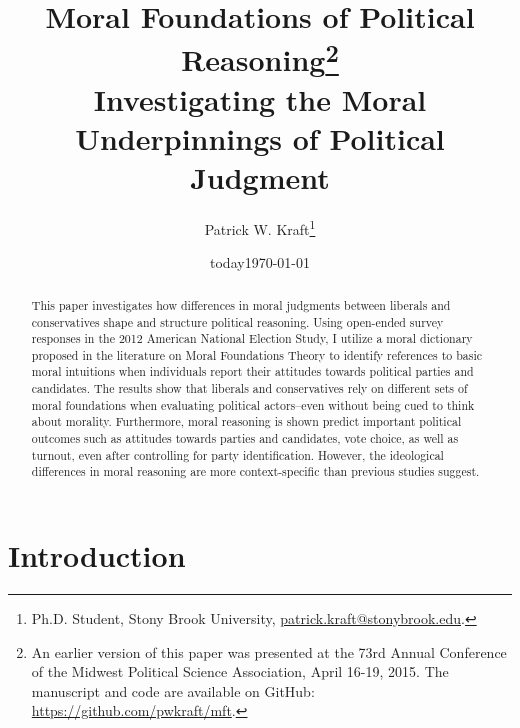\documentclass[12pt]{article}
\author{Patrick W. Kraft\footnote{Ph.D. Student, Stony Brook University, \href{mailto:patrick.kraft@stonybrook.edu}{patrick.kraft@stonybrook.edu}.
}}
\date{today}
\title{Moral Foundations of Political Reasoning\footnote{An earlier version of this paper was presented at the 73rd Annual Conference of the Midwest Political Science Association, April 16-19, 2015. The manuscript and code are available on GitHub: \url{https://github.com/pwkraft/mft}.}\\
\large{Investigating the Moral Underpinnings of Political Judgment}}
\date{\today}
\begin{document}
\maketitle
\onehalfspacing

\begin{abstract}
This paper investigates how differences in moral judgments between liberals and conservatives shape and structure political reasoning. Using open-ended survey responses in the 2012 American National Election Study, I utilize a moral dictionary proposed in the literature on Moral Foundations Theory to identify references to basic moral intuitions when individuals report their attitudes towards political parties and candidates. The results show that liberals and conservatives rely on different sets of moral foundations when evaluating political actors--even without being cued to think about morality. Furthermore, moral reasoning is shown predict important political outcomes such as attitudes towards parties and candidates, vote choice, as well as turnout, even after controlling for party identification. However, the ideological differences in moral reasoning are more context-specific than previous studies suggest.

\end{abstract}
\newpage


\section{Introduction}
\end{document}
